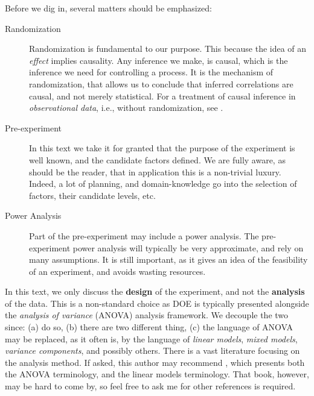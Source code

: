 Before we dig in, several matters should be emphasized:
\begin{description}
\item [Randomization] Randomization is fundamental to our purpose. This because the idea of an \emph{effect} implies causality. Any inference we make, is causal, which is the inference we need for controlling a process.
It is the mechanism of randomization, that allows us to conclude that inferred correlations are causal, and not merely statistical.
For a treatment of causal inference in \emph{observational data}, i.e., without randomization, see \cite{rosenbaum_observational_2002}.

\item [Pre-experiment] In this text we take it for granted that the purpose of the experiment is well known, and the candidate factors defined. We are fully aware, as should be the reader, that in application this is a non-trivial luxury. Indeed, a lot of planning, and domain-knowledge go into the selection of factors, their candidate levels, etc.

\item [Power Analysis] Part of the pre-experiment may include a power analysis. The pre-experiment power analysis will typically be very approximate, and rely on many assumptions. It is still important, as it gives an idea of the feasibility of an experiment, and avoids wasting resources.
\end{description}



\begin{remark}
In this text, we only discuss the \textbf{design} of the experiment, and not the \textbf{analysis} of the data.
This is a non-standard choice as DOE is typically presented alongside the \emph{analysis of variance} (ANOVA) analysis framework.
We decouple the two since: 
(a) \cite{cox_theory_2000} do so, 
(b) there are two different thing, 
(c) the language of ANOVA may be replaced, as it often is, by the language of \emph{linear models}, \emph{mixed models}, \emph{variance components}, and possibly others. 
There is a vast literature focusing on the analysis method. 
If asked, this author may recommend \cite{hocking_analysis_1985}, which presents both the ANOVA terminology, and the linear models terminology.
That book, however, may be hard to come by, so feel free to ask me for other references is required.
\end{remark}





